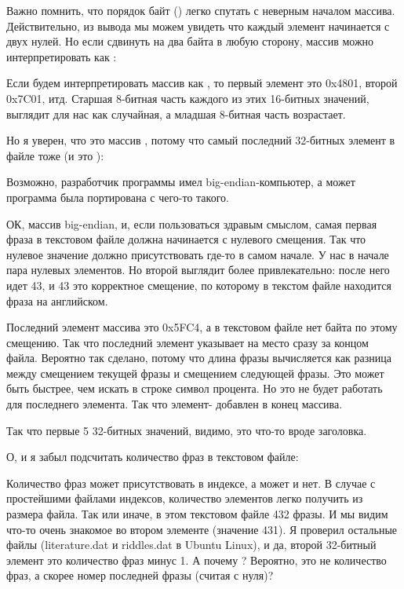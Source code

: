Важно помнить, что порядок байт () легко спутать с неверным началом массива.
Действительно, из вывода  мы можем увидеть что каждый элемент начинается с двух нулей.
Но если сдвинуть на два байта в любую сторону, массив можно интерпретировать как :



Если будем интерпретировать массив как , то первый элемент это 0x4801, второй 0x7C01, итд.
Старшая 8-битная часть каждого из этих 16-битных значений, выглядит для нас как случайная, а младшая 8-битная часть
возрастает.

Но я уверен, что это массив , потому что самый последний 32-битных элемент в файле
тоже  (и это ):



Возможно, разработчик программы  имел big-endian-компьютер, а может программа была портирована с чего-то такого.

ОК, массив big-endian, и, если пользоваться здравым смыслом, самая первая фраза в текстовом файле должна начинается с нулевого
смещения.
Так что нулевое значение должно присутствовать где-то в самом начале.
У нас в начале пара нулевых элементов. Но второй выглядит более привлекательно: после него идет 43, и 43 это корректное
смещение, по которому в текстом файле находится фраза на английском.

Последний элемент массива это 0x5FC4, а в текстовом файле нет байта по этому смещению.
Так что последний элемент указывает на место сразу за концом файла.
Вероятно так сделано, потому что длина фразы вычисляется как разница между смещением текущей фразы
и смещением следующей фразы.
Это может быть быстрее, чем искать в строке символ процента. 
Но это не будет работать для последнего элемента.
Так что элемент- добавлен в конец массива.

Так что первые 5 32-битных значений, видимо, это что-то вроде заголовка.

О, и я забыл подсчитать количество фраз в текстовом файле:



Количество фраз может присутствовать в индексе, а может и нет.
В случае с простейшими файлами индексов, количество элементов легко получить из размера файла.
Так или иначе, в этом текстовом файле 432 фразы.
И мы видим что-то очень знакомое во втором элементе (значение 431).
Я проверил остальные файлы (literature.dat и riddles.dat в Ubuntu Linux), и да, второй 32-битный элемент это
количество фраз минус 1.
А почему ? Вероятно, это не количество фраз, а скорее номер последней фразы (считая с нуля)?

